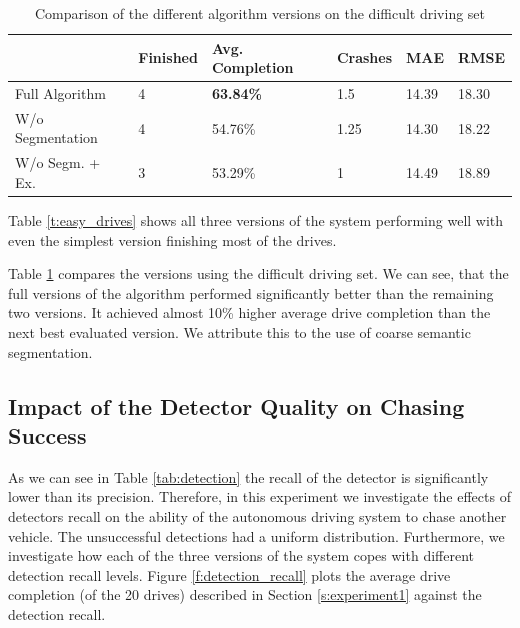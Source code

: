 \documentclass{ctuthesis/ctuthesis}
\begin{document}
\begin{table}[]
\tabcolsep=0.11cm
\begin{tabular}{l|lllll}
\hline
                                      & Finished & Avg. Completion & Crashes & MAE   & RMSE   \\ \hline
Full Algorithm                         & 4               & \textbf{63.84\%}         & 1.5     & 14.39 & 18.30    \\
W/o Segmentation                   & 4               & 54.76\%                  & 1.25    & 14.30 & 18.22 \\
W/o Segm. + Ex. & 3               & 53.29\%                  & 1       & 14.49 & 18.89    \\ \hline
\end{tabular}
\caption{Comparison of the different algorithm versions on the difficult driving set}\label{t:difficult_drives}
\end{table}

Table \ref{t:easy_drives} shows all three versions of the system performing well with even the simplest version finishing most of the drives. \par
Table \ref{t:difficult_drives} compares the versions using the difficult driving set. We can see, that the full versions of the algorithm performed significantly better than the remaining two versions. It achieved almost 10\% higher average drive completion than the next best evaluated version. We attribute this to the use of coarse semantic segmentation. \par






\subsection{Impact of the Detector Quality on Chasing Success}
As we can see in Table \ref{tab:detection} the recall of the detector is significantly lower than its precision. Therefore, in this experiment we investigate the effects of detectors recall on the ability of the autonomous driving system to chase another vehicle. The unsuccessful detections had a uniform distribution. Furthermore, we investigate how each of the three versions of the system copes with different detection recall levels. Figure \ref{f:detection_recall} plots the average drive completion (of the 20 drives) described in Section \ref{s:experiment1} against the detection recall. \par
\end{document}
